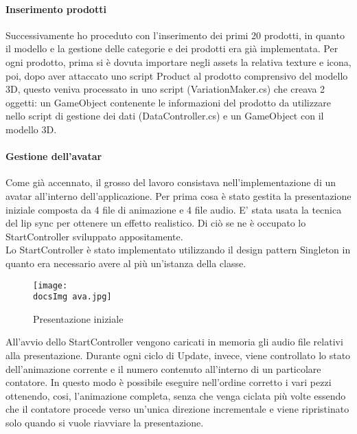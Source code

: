 \paragraph{Inserimento prodotti}
Successivamente ho proceduto con l'inserimento dei primi 20 prodotti, in quanto il modello e la gestione delle categorie e dei prodotti era gi\`a implementata. Per ogni prodotto, prima si \`e dovuta importare negli assets la relativa texture e icona, poi, dopo aver attaccato uno script Product al prodotto comprensivo del modello 3D, questo veniva processato in uno script (VariationMaker.cs) che creava 2 oggetti: un GameObject contenente le informazioni del prodotto da utilizzare nello script di gestione dei dati (DataController.cs) e un GameObject con il modello 3D.\\

\paragraph{Gestione dell'avatar}
Come gi\`a accennato, il grosso del lavoro consistava nell'implementazione di un avatar all'interno dell'applicazione. Per prima cosa \`e stato gestita la presentazione iniziale composta da 4 file di animazione e 4 file audio. E' stata usata la tecnica del lip sync per ottenere un effetto realistico. Di ci\`o se ne \`e occupato lo StartController sviluppato appositamente.\\
Lo StartController \`e stato implementato utilizzando il design pattern Singleton in quanto era necessario avere al pi\`u un'istanza della classe.\\

	
	\begin{figure}[H]
		\centering
		\texttt{[image: \\docsImg ava.jpg]}
		\caption{Presentazione iniziale}
		\label{fig:Presentazione iniziale}
	\end{figure}


All'avvio dello StartController vengono caricati in memoria gli audio file relativi alla presentazione. Durante ogni ciclo di Update, invece, viene controllato lo stato dell'animazione corrente e il numero contenuto all'interno di un particolare contatore. In questo modo \`e possibile eseguire nell'ordine corretto i vari pezzi ottenendo, cosi, l'animazione completa, senza che venga ciclata pi\`u volte essendo che il contatore procede verso un'unica direzione incrementale e viene ripristinato solo quando si vuole riavviare la presentazione.\\

